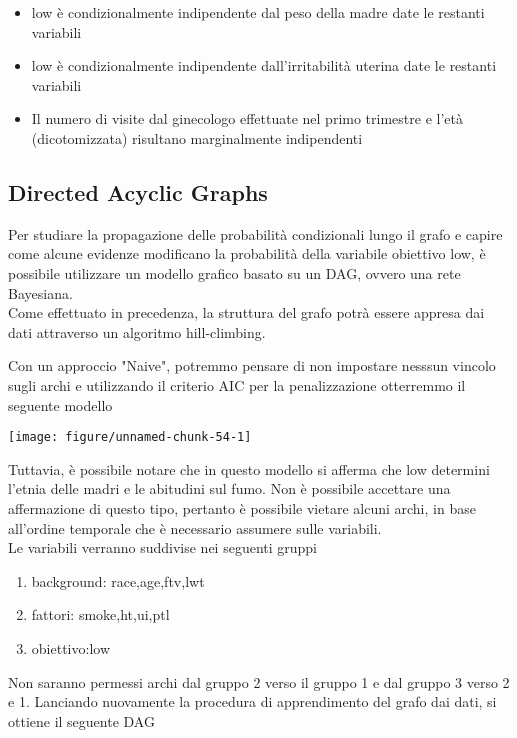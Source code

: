 \documentclass{article}\usepackage[]{graphicx}\usepackage[]{color}
\makeatletter
\def\maxwidth{ %
  \ifdim\Gin@nat@width>\linewidth
    \linewidth
  \else
    \Gin@nat@width
  \fi
}
\newenvironment{knitrout}{}{} %
\makeatother
\begin{document}
\begin{itemize}
\item low è condizionalmente indipendente dal peso della madre date le restanti variabili
\item low è condizionalmente indipendente dall'irritabilità uterina date le restanti variabili
\item Il numero di visite dal ginecologo effettuate nel primo trimestre e l'età (dicotomizzata) risultano marginalmente indipendenti
\end{itemize}

\subsection{Directed Acyclic Graphs}
Per studiare la propagazione delle probabilità condizionali lungo il grafo e capire come alcune evidenze modificano la probabilità della variabile obiettivo low,
è possibile utilizzare un modello grafico basato su un DAG, ovvero una rete Bayesiana.
\\Come effettuato in precedenza, la struttura del grafo potrà essere appresa dai dati attraverso un algoritmo hill-climbing.



Con un approccio "Naive", potremmo pensare di non impostare nesssun vincolo sugli archi e utilizzando il criterio AIC per la penalizzazione otterremmo il seguente modello

\begin{knitrout}
\color{fgcolor}
\texttt{[image: figure/unnamed-chunk-54-1]} 
\end{knitrout}

Tuttavia, è possibile notare che in questo modello si afferma che low determini l'etnia delle madri e le abitudini sul fumo.
Non è possibile accettare una affermazione di questo tipo, pertanto è possibile vietare alcuni archi, in base all'ordine temporale che è necessario assumere sulle variabili.
\\Le variabili verranno suddivise nei seguenti gruppi

\begin{enumerate}
\item{background}: race,age,ftv,lwt
\item{fattori}: smoke,ht,ui,ptl
\item{obiettivo}:low
\end{enumerate}

Non saranno permessi archi dal gruppo 2 verso il gruppo 1 e dal gruppo 3 verso 2 e 1.
Lanciando nuovamente la procedura di apprendimento del grafo dai dati, si ottiene il seguente DAG
\end{document}
